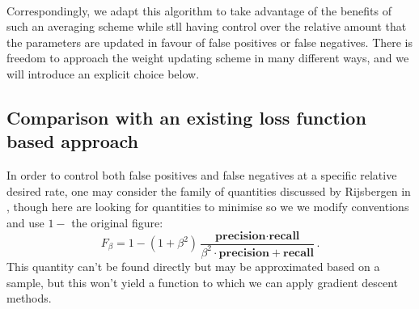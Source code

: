 \documentclass[10pt,a4paper]{article}
\begin{document}
\\

Correspondingly, we adapt this algorithm to take advantage of the benefits of such an averaging scheme while stll having control over the relative amount that the parameters are updated in favour of false positives or false negatives.
There is freedom to approach the weight updating scheme in many different ways, and we will introduce an explicit choice below.


\subsection{Comparison with an existing loss function based approach}

In order to control both false positives and false negatives at a specific relative desired rate, one may consider the family of quantities discussed by Rijsbergen in \cite{van1979information}, though here are looking for quantities to minimise so we we modify conventions and use $1-$ the original figure:
$$
F_\beta=1-(1+\beta^2)\frac{\textbf{precision}\cdot\textbf{recall}}{\beta^2\cdot\textbf{precision}+\textbf{recall}}.
$$
This quantity can't be found directly but may be approximated based on a sample, but this won't yield a function to which we can apply gradient descent methods.
\end{document}
